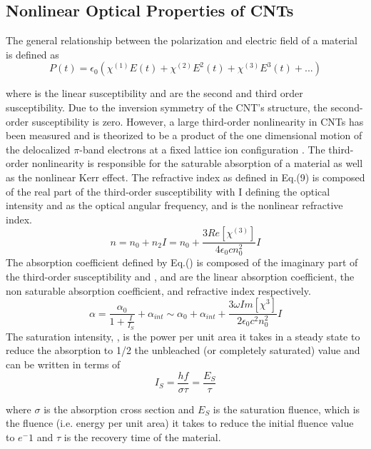 \subsection{Nonlinear Optical Properties of CNTs}
The general relationship between the polarization and electric field of a material is defined \cite{yamashita.tutorial} as
\begin{equation}
	P(t) = \epsilon_0(\chi^{(1)}E(t) + \chi^{(2)}E^2(t) + \chi^{(3)}E^3(t)+...)
\end{equation}

where is the linear susceptibility and are the second and third order susceptibility. Due to the inversion symmetry of the CNT’s structure, the second-order susceptibility is zero. However, a large third-order nonlinearity in CNTs has been measured \cite{martinez} and is theorized to be a product of the one dimensional motion of the delocalized $\pi$-band electrons at a fixed lattice ion configuration \cite{margulis}.  The third-order nonlinearity is responsible for the saturable absorption of a material as well as the nonlinear Kerr effect.
The refractive index as defined in Eq.(9) is composed of the real part of the third-order susceptibility with I defining the optical intensity and  as the optical angular frequency, and  is the nonlinear refractive index.
\begin{equation}
	n = n_0 + n_2I = n_0 + \frac{3Re[\chi^{(3)}]}{4\epsilon_0cn_0^2}I
\end{equation}
The absorption coefficient defined by Eq.() is composed of the imaginary part of the third-order susceptibility and  ,  and  are the linear absorption coefficient, the non saturable absorption coefficient, and refractive index respectively. 
\begin{equation}
\alpha = \frac{\alpha_0}{1+\frac{I}{I_S}} + \alpha_{int} \sim\alpha_0 + \alpha_{int} + \frac{3\omega Im[\chi^{3}]}{2\epsilon_0c^2n_0^2}I
\end{equation}
The saturation intensity, , is the power per unit area it takes in a steady state to reduce the absorption to 1/2 the unbleached (or completely saturated) value and can be written in terms of
\begin{equation}
	I_S = \frac{hf}{\sigma\tau} =\frac{E_S}{\tau}
\end{equation}

where  $\sigma$ is the absorption cross section and $E_S$ is the saturation fluence, which is the fluence (i.e. energy per unit area) it takes to reduce the initial fluence value to $e^-1$ and  $\tau$ is the recovery time of the material.


